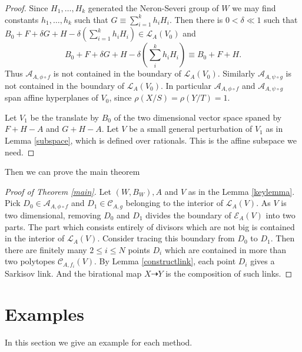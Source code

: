 \documentclass[11pt]{amsart}
\begin{document}
\begin{proof}
Since $H_{1},\ldots ,H_{k}$ generated the Neron-Severi group of $W$ we may find constants $h_{1},\ldots ,h_{k}$ such that $G \equiv \sum^{k}_{i=1} h_{i}H_{i}$. Then there is $0< \delta\ll 1$ such that  $B_{0}+F+\delta G+H- \delta(\sum_{i=1}^{k} h_{i}H_{i}) \in \mathcal{L}_{A}(V_{0})$ and
\[
  B_{0}+F+\delta G+H-\delta (\sum_i^k h_{i}H_{i}) \equiv B_{0}+F+H
.\]
Thus $\mathcal{A}_{A,\phi\circ f}$ is not contained in the boundary of $\mathcal{L}_{A}(V_{0})$. Similarly $\mathcal{A}_{A,\psi\circ g}$ is not contained in the boundary of $\mathcal{L}_{A}(V_{0})$. In particular $\mathcal{A}_{A,\phi\circ f}$ and   $\mathcal{A}_{A,\psi\circ g}$ span affine hyperplanes of $V_{0}$, since $\rho(X/S)=\rho(Y/T)=1$.

Let $V_{1}$ be the translate by $B_{0}$ of the two dimensional vector space spaned by $F+H-A$ and $G+H-A$. Let $V$ be a small general perturbation of $V_{1}$ as in Lemma \ref{subspace}, which is defined over rationals. This is the affine subspace we need.
\end{proof}
Then we can prove the main theorem

\begin{proof}[Proof of Theorem \ref{main}]
Let $(W,B_{W}),A $ and $V$ as in the Lemma \ref{keylemma}.  Pick $ D_{0} \in \mathcal{A}_{A,\phi\circ f} $  and $ D_1\in \mathcal{C}_{A,g} $ belonging to the interior of $ \mathcal{L}_A(V) $. As $ V $ is two dimensional, removing $ D_0 $ and $ D_1 $ divides the boundary of $ \mathcal{E}_A(V) $ into two parts. The part which consists entirely of divisors which are not big is contained in the interior of $ \mathcal{L}_A(V) $. Consider tracing this boundary from $ D_0 $ to $ D_1 $. Then there are finitely many $ 2\leqslant i\leqslant N $ points $ D_i $ which are contained in more than two polytopes $ \mathcal{C}_{A,f_i}(V) $. By Lemma \ref{constructlink},  each point $ D_i $ gives a Sarkisov link. And the birational map $X \dashrightarrow Y$ is the composition of such links.
\end{proof}

\section{Examples}
In this  section we give an example for each method.
\end{document}
